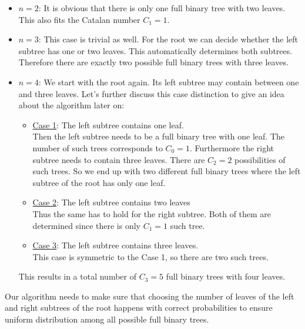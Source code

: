\begin{itemize}
\item \underline{$n=2$}: It is obvious that there is only one full binary tree with two leaves. This also fits the Catalan number $C_1=1$.
\item \underline{$n=3$}: This case is trivial as well. For the root we can decide whether the left subtree has one or two leaves. This automatically determines both subtrees. Therefore there are exactly two possible full binary trees with three leaves.
\item \underline{$n=4$}: We start with the root again. Its left subtree may contain between one and three leaves. Let's further discuss this case distinction to give an idea about the algorithm later on:
\begin{itemize}
\item \underline{Case 1}: The left subtree contains one leaf.\\
Then the left subtree needs to be a full binary tree with one leaf. The number of such trees corresponds to $C_0=1$. Furthermore the right subtree needs to contain three leaves. There are $C_2=2$ possibilities of such trees. So we end up with two different full binary trees where the left subtree of the root has only one leaf.
\item \underline{Case 2}: The left subtree contains two leaves \\
Thus the same has to hold for the right subtree. Both of them are determined since there is only $C_1=1$ such tree.
\item \underline{Case 3}: The left subtree contains three leaves.\\
 \quad This case is symmetric to the Case 1, so there are two such trees.
\end{itemize}
This results in a total number of $C_3=5$ full binary trees with four leaves. 
\end{itemize}
Our algorithm needs to make sure that choosing the number of leaves of the left and right subtrees of the root happens with correct probabilities to ensure uniform distribution among all possible full binary trees.

